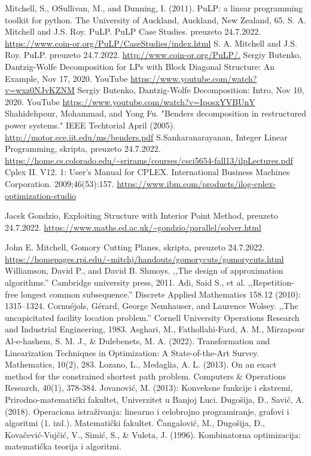 \documentclass[b5paper, utf8, 11pt, colorlinks]{book}
\theoremstyle{definition}
\begin{document}
\begin{thebibliography}{widest entry}
	      Mitchell, S., OSullivan, M., and Dunning, I. (2011). PuLP: a linear programming toolkit for python. The University of Auckland, Auckland, New Zealand, 65.
	      S. A. Mitchell and J.S. Roy. PuLP. PuLP Case Studies. preuzeto 24.7.2022. \url{https://www.coin-or.org/PuLP/CaseStudies/index.html}
	       S. A. Mitchell and J.S. Roy. PuLP. preuzeto 24.7.2022. \url{ http://www.coin-or.org/PuLP/.}
          Sergiy Butenko, Dantzig-Wolfe Decomposition for LPs with Block Diagonal Structure: An Example, Nov 17, 2020. YouTube  \url{https://www.youtube.com/watch?v=wxz0NJvKZNM}
            Sergiy Butenko, Dantzig-Wolfe Decomposition: Intro, Nov 10, 2020. YouTube \url{https://www.youtube.com/watch?v=IposxYVBUnY}
             Shahidehpour, Mohammad, and Yong Fu. "Benders decomposition in restructured power systems." IEEE Techtorial April (2005). \url{http://motor.ece.iit.edu/ms/benders.pdf}
             S.Sankaranarayanan, Integer Linear Programming, skripta, preuzeto 24.7.2022. \url{https://home.cs.colorado.edu/\~srirams/courses/csci5654-fall13/ilpLectures.pdf}
   Cplex II. V12. 1: User’s Manual for CPLEX. International Business Machines Corporation. 2009;46(53):157. \url{https://www.ibm.com/products/ilog-cplex-optimization-studio}
  
    Jacek Gondzio, Exploiting Structure with Interior Point Method, preuzeto 24.7.2022.   \url{https://www.maths.ed.ac.uk/~gondzio/parallel/solver.html}
   
     John E. Mitchell, Gomory Cutting Planes, skripta, preuzeto 24.7.2022. \url{https://homepages.rpi.edu/~mitchj/handouts/gomorycuts/gomorycuts.html}
     Williamson, David P., and David B. Shmoys. ,,The design of approximation algorithms.'' Cambridge university press, 2011.
     Adi, Said S., et al. ,,Repetition-free longest common subsequence.'' Discrete Applied Mathematics 158.12 (2010): 1315--1324.
       Cornuéjols, Gérard, George Nemhauser, and Laurence Wolsey. ,,The uncapicitated facility location problem.'' Cornell University Operations Research and Industrial Engineering, 1983.
     Asghari, M., Fathollahi-Fard, A. M., Mirzapour Al-e-hashem, S. M. J., \& Dulebenets, M. A. (2022). Transformation and Linearization Techniques in Optimization: A State-of-the-Art Survey. Mathematics, 10(2), 283.
     Lozano, L., Medaglia, A. L. (2013). On an exact method for the constrained shortest path problem. Computers \& Operations Research, 40(1), 378-384.
     Jovanović, M. (2013): Konveksne funkcije i ekstremi, Prirodno-matematički fakultet, Univerzitet u Banjoj Luci.
     Dugošija, Đ., Savić, A. (2018). Operaciona istraživanja: linearno i celobrojno programiranje, grafovi i algoritmi (1. izd.). Matematički fakultet.
     Čangalović, M., Dugošija, Đ., Kovačević-Vujčić, V., Simić, S., \& Vuleta, J. (1996). Kombinatorna optimizacija: matematička teorija i algoritmi.
\end{thebibliography}
\end{document}
